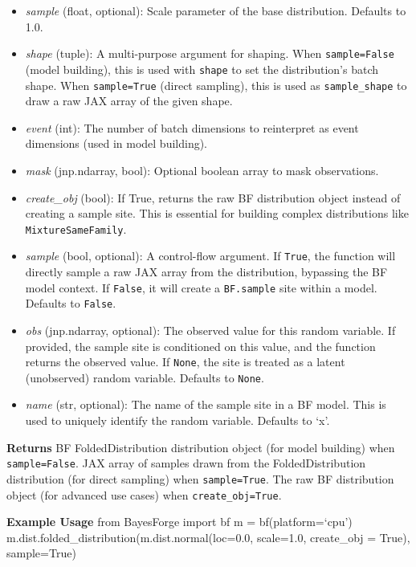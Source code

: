 \documentclass[
  letterpaper,
  DIV=11,
  numbers=noendperiod]{scrartcl}
\begin{document}
\begin{itemize}
\item
  \emph{sample} (float, optional): Scale parameter of the base
  distribution. Defaults to 1.0.
\item
  \emph{shape} (tuple): A multi-purpose argument for shaping. When
  \texttt{sample=False} (model building), this is used with
  \texttt{shape} to set the distribution's batch shape. When
  \texttt{sample=True} (direct sampling), this is used as
  \texttt{sample\_shape} to draw a raw JAX array of the given shape.
\item
  \emph{event} (int): The number of batch dimensions to reinterpret as
  event dimensions (used in model building).
\item
  \emph{mask} (jnp.ndarray, bool): Optional boolean array to mask
  observations.
\item
  \emph{create\_obj} (bool): If True, returns the raw BF distribution
  object instead of creating a sample site. This is essential for
  building complex distributions like \texttt{MixtureSameFamily}.
\item
  \emph{sample} (bool, optional): A control-flow argument. If
  \texttt{True}, the function will directly sample a raw JAX array from
  the distribution, bypassing the BF model context. If \texttt{False},
  it will create a \texttt{BF.sample} site within a model. Defaults to
  \texttt{False}.
\item
  \emph{obs} (jnp.ndarray, optional): The observed value for this random
  variable. If provided, the sample site is conditioned on this value,
  and the function returns the observed value. If \texttt{None}, the
  site is treated as a latent (unobserved) random variable. Defaults to
  \texttt{None}.
\item
  \emph{name} (str, optional): The name of the sample site in a BF
  model. This is used to uniquely identify the random variable. Defaults
  to `x'.
\end{itemize}

\textbf{Returns} BF FoldedDistribution distribution object (for model
building) when \texttt{sample=False}. JAX array of samples drawn from
the FoldedDistribution distribution (for direct sampling) when
\texttt{sample=True}. The raw BF distribution object (for advanced use
cases) when \texttt{create\_obj=True}.

\textbf{Example Usage} from BayesForge import bf m = bf(platform=`cpu')
m.dist.folded\_distribution(m.dist.normal(loc=0.0, scale=1.0,
create\_obj = True), sample=True)
\end{document}
